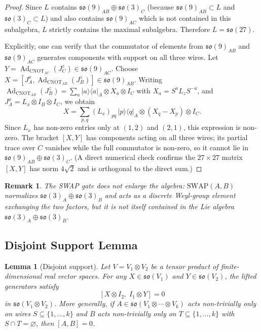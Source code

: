 \documentclass[12pt,a4paper]{article}
\newtheorem{lemma}[theorem]{Lemma}
\newtheorem{remark}[theorem]{Remark}
\newcommand{\Ad}{\operatorname{Ad}}
\begin{document}
\begin{proof}
Since $L$ contains $\mathfrak{so}(9)_{AB}\oplus\mathfrak{so}(3)_C$
(because $\mathfrak{so}(9)_{AB} \subset L$ and $\mathfrak{so}(3)_C
\subset L$) and also contains $\mathfrak{so}(9)_{AC}$ which is not
contained in this subalgebra, $L$ strictly contains the maximal
subalgebra. Therefore $L = \mathfrak{so}(27)$.

Explicitly, one can verify that the commutator of elements from
$\mathfrak{so}(9)_{AB}$ and $\mathfrak{so}(9)_{AC}$ generates components
with support on all three wires. Let $Y = \Ad_{\text{CNOT}_{AC}}(J^z_C)
\in \mathfrak{so}(9)_{AC}$. Choose $X = [J^x_A,
\Ad_{\text{CNOT}_{AB}}(J^z_B)] \in \mathfrak{so}(9)_{AB}$. Writing
$\Ad_{\text{CNOT}_{AB}}(J^z_B) = \sum_{a} |a\rangle\langle a|_A \otimes
X_a \otimes I_C$ with $X_a = S^a L_z S^{-a}$, and $J^x_A = L_x \otimes
I_B \otimes I_C$, we obtain
\[
X = \sum_{p,q} (L_x)_{pq}\, |p\rangle\langle q|_A \otimes (X_q - X_p)
\otimes I_C.
\]
Since $L_x$ has non-zero entries only at $(1,2)$ and $(2,1)$,
this expression is non-zero. The bracket $[X,Y]$ has components acting
on all three wires; its partial trace over $C$ vanishes while the
full commutator is non-zero, so it cannot lie in $\mathfrak{so}(9)_{AB}
\oplus \mathfrak{so}(3)_C$. (A direct numerical check confirms the
$27\times 27$ matrix $[X,Y]$ has norm $4\sqrt{2}$ and is orthogonal
to the direct sum.)
\end{proof}

\begin{remark}
The SWAP gate does not enlarge the algebra: $\text{SWAP}(A,B)$ normalizes
$\mathfrak{so}(3)_A\oplus\mathfrak{so}(3)_B$ and acts as a discrete
Weyl-group element exchanging the two factors, but it is not itself
contained in the Lie algebra $\mathfrak{so}(3)_A\oplus\mathfrak{so}(3)_B$.
\end{remark}

\subsection{Disjoint Support Lemma}
\label{sec:disjoint}

\begin{lemma}[Disjoint support]
\label{lemma:disjoint}
Let $V = V_1 \otimes V_2$ be a tensor product of finite-dimensional
real vector spaces. For any $X \in \mathfrak{so}(V_1)$ and
$Y \in \mathfrak{so}(V_2)$, the lifted generators satisfy
\[
[X \otimes I_2,\; I_1 \otimes Y] = 0
\]
in $\mathfrak{so}(V_1 \otimes V_2)$. More generally, if
$A \in \mathfrak{so}(V_1 \otimes \cdots \otimes V_k)$ acts
non-trivially only on wires $S \subseteq \{1,\dots,k\}$ and
$B$ acts non-trivially only on $T \subseteq \{1,\dots,k\}$ with
$S \cap T = \varnothing$, then $[A,B] = 0$.
\end{lemma}
\end{document}
